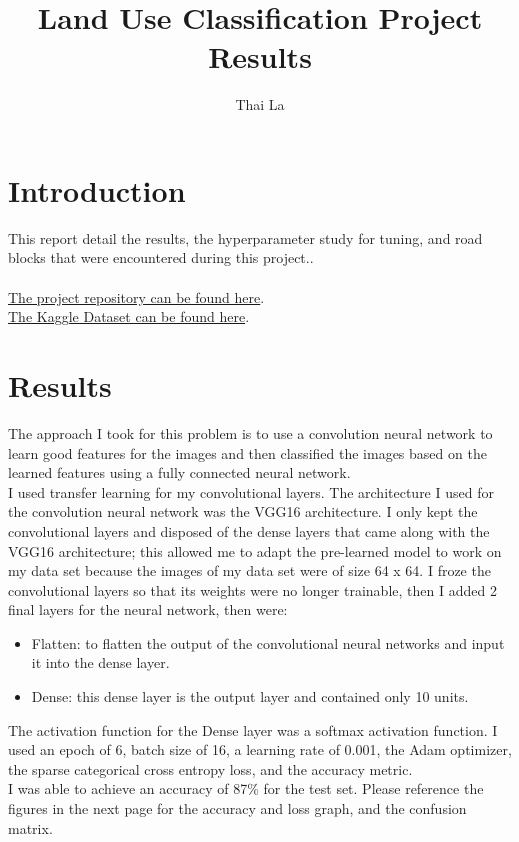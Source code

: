 \documentclass[acmtog]{acmart}
\begin{document}
	\title{Land Use Classification Project Results}
	
	\author{Thai La}
	
	
	\maketitle
	
	\section{Introduction}
	This report detail the results, the hyperparameter study for tuning, and road blocks that were encountered during this project..\\ \\
	\href{https://git.cs.usask.ca/vtl932/cmpt318_course_project}{The project repository can be found here}.\\
	\href{https://www.kaggle.com/datasets/apollo2506/eurosat-dataset?select=EuroSAT}{The Kaggle Dataset can be found here}.
	
	\section{Results}
	The approach I took for this problem is to use a convolution neural network to learn good features for the images and then classified the images based on the learned features using a fully connected neural network.
	\\
	I used transfer learning for my convolutional layers. The architecture I used for the convolution neural network was the VGG16 architecture. I only kept the convolutional layers and disposed of the dense layers that came along with the VGG16 architecture; this allowed me to adapt the pre-learned model to work on my data set because the images of my data set were of size 64 x 64. I froze the convolutional layers so that its weights were no longer trainable, then I added 2 final layers for the neural network, then were:
	
	\begin{itemize}
		\item Flatten: to flatten the output of the convolutional neural networks and input it into the dense layer.
		\item Dense: this dense layer is the output layer and contained only 10 units.
	\end{itemize}
	The activation function for the Dense layer was a softmax activation function.
	I used an epoch of 6, batch size of 16, a learning rate of 0.001, the Adam optimizer, the sparse categorical cross entropy loss, and the accuracy metric.
	\\
	I was able to achieve an accuracy of 87\% for the test set. Please reference the figures in the next page for the accuracy and loss graph, and the confusion matrix.
	
\end{document}
